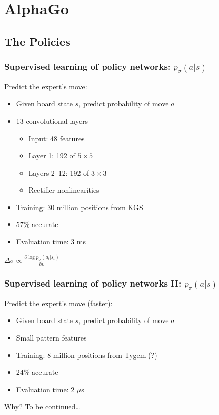 \documentclass{beamer}
\begin{document}
\section{AlphaGo}

\subsection{The Policies}

\begin{frame}
  \frametitle{Supervised learning of policy networks: $p_\sigma(a|s)$}
  Predict the expert's move:
  \begin{itemize}
  \item Given board state $s$, predict probability of move $a$
  \item 13 convolutional layers
    \begin{itemize}
    \item Input: 48 features
    \item Layer 1: 192 of $5\times 5$
    \item Layers 2--12: 192 of $3\times 3$
    \item Rectifier nonlinearities
    \end{itemize}
  \item Training: 30 million positions from KGS
  \item 57\% accurate
  \item Evaluation time: 3 ms
  \end{itemize}
  \begin{tcolorbox}
    \begin{center}
      $\Delta \sigma \propto \frac{\partial \log p_\sigma(a_t|s_t)}{\partial \sigma}$
    \end{center}
  \end{tcolorbox}
\end{frame}

\begin{frame}
  \frametitle{Supervised learning of policy networks II: $p_\pi(a|s)$}
  Predict the expert's move (faster):
  \begin{itemize}
  \item Given board state $s$, predict probability of move $a$
  \item Small pattern features
  \item Training: 8 million positions from Tygem (?)
  \item 24\% accurate
  \item Evaluation time: 2 $\mu$s
  \end{itemize}
  Why? To be continued\dots
\end{frame}
\end{document}
